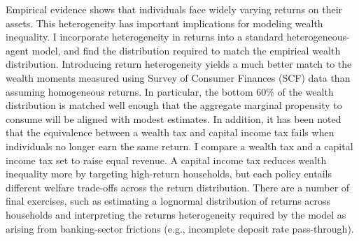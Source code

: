 Empirical evidence shows that individuals face widely varying returns on their assets. This heterogeneity has important implications for modeling wealth inequality. I incorporate heterogeneity in returns into a standard heterogeneous-agent model, and find the distribution required to match the empirical wealth distribution. Introducing return heterogeneity yields a much better match to the wealth moments measured using Survey of Consumer Finances (SCF) data than assuming homogeneous returns. In particular, the bottom 60\% of the wealth distribution is matched well enough that the aggregate marginal propensity to consume will be aligned with modest estimates. In addition, it has been noted that the equivalence between a wealth tax and capital income tax fails when individuals no longer earn the same return. I compare a wealth tax and a capital income tax set to raise equal revenue. A capital income tax reduces wealth inequality more by targeting high-return households, but each policy entails different welfare trade-offs across the return distribution. There are a number of final exercises, such as estimating a lognormal distribution of returns across households and interpreting the returns heterogeneity required by the model as arising from banking-sector frictions (e.g., incomplete deposit rate pass-through).